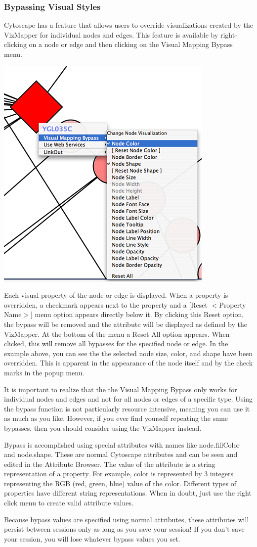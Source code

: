  

\subsubsection*{Bypassing Visual Styles}


 Cytoscape has a feature that allows users to override visualizations created by the VizMapper for individual nodes and edges. This feature is available by right-clicking on a node or edge and then clicking on the Visual Mapping Bypass menu. 

\includegraphics[width=.6\textwidth]{images/VizmapBypass26.png} 


 Each visual property of the node or edge is displayed. When a property is overridden, a checkmark appears next to the property and a [Reset $<$Property Name$>$] menu option appears directly below it. By clicking this Reset option, the bypass will be removed and the attribute will be displayed as defined by the VizMapper. At the bottom of the menu a Reset All option appears. When clicked, this will remove all bypasses for the specified node or edge. In the example above, you can see the the selected node size, color, and shape have been overridden. This is apparent in the appearance of the node itself and by the check marks in the popup menu. 


 It is important to realize that the the Visual Mapping Bypass only works for individual nodes and edges and not for all nodes or edges of a specific type. Using the bypass function is not particularly resource intensive, meaning you can use it as much as you like. However, if you ever find yourself repeating the same bypasses, then you should consider using the VizMapper instead. 


 Bypass is accomplished using special attributes with names like node.fillColor and node.shape. These are normal Cytoscape attributes and can be seen and edited in the Attribute Browser. The value of the attribute is a string representation of a property. For example, color is represented by 3 integers representing the RGB (red, green, blue) value of the color. Different types of properties have different string representations. When in doubt, just use the right click menu to create valid attribute values. 


 Because bypass values are specified using normal attributes, these attributes will persist between sessions only as long as you save your session! If you don't save your session, you will lose whatever bypass values you set. 

